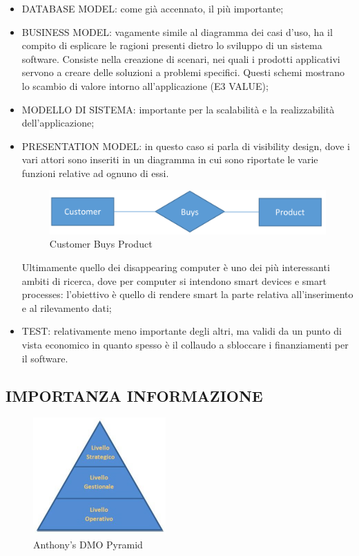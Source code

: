 \begin{itemize}

\item{DATABASE MODEL}: come già accennato, il più importante;
\item{BUSINESS MODEL}: vagamente simile al diagramma dei casi d’uso, ha il compito di esplicare le ragioni presenti dietro lo sviluppo di un sistema software. Consiste nella creazione di scenari, nei quali i prodotti applicativi servono a creare delle soluzioni a problemi specifici. Questi schemi mostrano lo scambio di valore intorno all’applicazione (E3 VALUE);
\item{MODELLO DI SISTEMA}: importante per la scalabilità e la realizzabilità dell’applicazione;

\item{PRESENTATION MODEL}: in questo caso si parla di visibility design, dove i vari attori sono inseriti in un diagramma in cui sono riportate le varie funzioni relative ad ognuno di essi.

\begin{center}
\begin{figure}[H]
\centering
\includegraphics[scale=1]{figures/cbuyp3.png}
\caption{Customer Buys Product}
\end{figure}
\end{center}

Ultimamente quello dei disappearing computer è uno dei più interessanti ambiti di ricerca, dove per computer si intendono smart devices e smart processes: l’obiettivo è quello di rendere smart la parte relativa all’inserimento e al rilevamento dati;

\item{TEST}: relativamente meno importante degli altri, ma validi da un punto di vista economico in quanto spesso è il collaudo a sbloccare i finanziamenti per il software. 
 
\end{itemize}

\subsection{IMPORTANZA INFORMAZIONE}

\begin{center}
\begin{figure}[H]
\centering
\includegraphics[scale=1]{figures/dmo.png}
\caption{Anthony's DMO Pyramid}
\end{figure}
\end{center}

